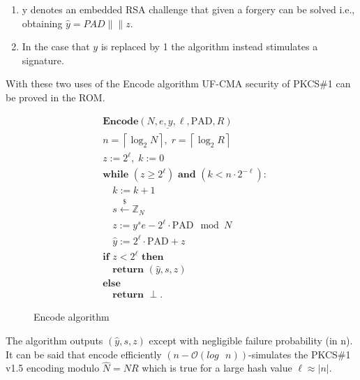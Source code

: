 \documentclass[]{final_report}
\theoremstyle{definition}
\begin{document}
\begin{enumerate}
\item y denotes an embedded RSA challenge that given a forgery can be solved i.e., obtaining \(\widehat{y} = PAD\|\|z \). 
\item In the case that \(y\) is replaced by 1 the algorithm instead stimulates a signature. 
\end{enumerate}
With these two uses of the Encode algorithm UF-CMA security of PKCS\#1 can be proved in the ROM. 

\begin{figure}[H]
\centering
\[
\boxed{
\begin{aligned}
&\underline{\textbf{Encode} (N, e, y, \ell, \text{PAD}, R)} \\
&n = \left\lceil \log_2 N \right\rceil, \; r = \left\lceil \log_2 R \right\rceil \\
&z := 2^\ell, \; k := 0 \\
&\textbf{while } (z \geq 2^\ell) \textbf{ and } (k < n \cdot 2^{-\ell}): \\
&\quad k := k + 1 \\
&\quad s \xleftarrow{\$} \mathbb{Z}_N \\
&\quad z := y^s e - 2^\ell \cdot \text{PAD} \mod N \\
&\quad \widehat{y} := 2^\ell \cdot \text{PAD} + z \\
&\textbf{if } z < 2^\ell \textbf{ then} \\
&\quad \textbf{return } (\widehat{y}, s, z) \\
&\textbf{else} \\
&\quad \textbf{return } \perp.
\end{aligned}
}
\]
\caption{Encode algorithm}
\label{fig:encode}
\end{figure}

The algorithm outputs \((\widehat{y}, s, z)\) except with negligible failure probability (in n). It can be said that encode efficiently $(n - \mathcal{O}(log \text{ } n))$-simulates the PKCS\#1 v1.5 encoding modulo $\hat{N} = NR$ which is true for a large hash value $\ell \approx |n|$.
\end{document}
